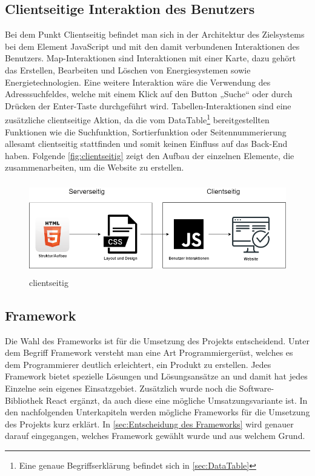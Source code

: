 \subsection{Clientseitige Interaktion des Benutzers}
Bei dem Punkt Clientseitig befindet man sich in der Architektur des Zielsystems bei dem Element JavaScript und mit den damit verbundenen Interaktionen des Benutzers. Map-Interaktionen sind Interaktionen mit einer Karte, dazu gehört das Erstellen, Bearbeiten und Löschen von Energiesystemen sowie Energietechnologien. Eine weitere Interaktion wäre die Verwendung des Adresssuchfeldes, welche mit einem Klick auf den Button „Suche“ oder durch Drücken der Enter-Taste durchgeführt wird. Tabellen-Interaktionen sind eine zusätzliche clientseitige Aktion, da die vom DataTable\footnote{Eine genaue Begriffserklärung befindet sich in \ref{sec:DataTable}} bereitgestellten Funktionen wie die Suchfunktion, Sortierfunktion oder Seitennummerierung allesamt clientseitig stattfinden und somit keinen Einfluss auf das Back-End haben.
Folgende \autoref{fig:clientseitig}
 zeigt den Aufbau der einzelnen Elemente, die zusammenarbeiten, um die Website zu erstellen.


\begin{figure}[h]
	\centering
	\includegraphics[height=4cm,width=12cm]{images/clientseitig}
	\caption{clientseitig}
	\label{fig:clientseitig}
\end{figure}
\newpage
\subsection{Framework}
Die Wahl des Frameworks ist für die Umsetzung des Projekts entscheidend. Unter dem Begriff Framework versteht man eine Art Programmiergerüst, welches es dem Programmierer deutlich erleichtert, ein Produkt zu erstellen. Jedes Framework bietet spezielle Lösungen und Lösungsansätze an und damit hat jedes Einzelne sein eigenes Einsatzgebiet. Zusätzlich wurde noch die Software-Bibliothek React ergänzt, da auch diese eine mögliche Umsatzungsvariante ist. In den nachfolgenden Unterkapiteln werden mögliche Frameworks für die Umsetzung des Projekts kurz erklärt. In \ref{sec:Entscheidung des Frameworks} wird genauer darauf eingegangen, welches Framework gewählt wurde und aus welchem Grund.

